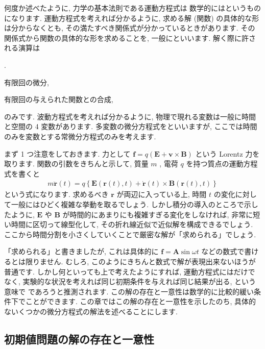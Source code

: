 \documentclass[openany, a4paper, oneside]{book}
\newcounter{enum2}
\renewenvironment{enumerate}{%
\begin{list}%
{%
\arabic{enum2}.\ \,%
}%
{%
\usecounter{enum2}
\setlength{\itemindent}{0pt}%
\setlength{\leftmargin}{6pt}%
\setlength{\rightmargin}{0pt}%
\setlength{\labelsep}{0pt}%
\setlength{\labelwidth}{6pt}%
\setlength{\itemsep}{0pt}%
\setlength{\parsep}{0pt}%
\setlength{\listparindent}{0pt}%
}
}{%
\end{list}%
}
\theoremstyle{break}
\theoremstyle{breakdefn}
\begin{document}
何度か述べたように, 力学の基本法則である運動方程式は
数学的にはというものになります.
運動方程式を考えれば分かるように,
求める解 (関数) の具体的な形は分からなくとも, その満たすべき関係式が分かっているときがあります.
その関係式から関数の具体的な形を求めることを,
一般にといいます.
解く際に許される演算は
\begin{enumerate}
\item[1)] 有限回の微分,
\item[2)] 有限回の与えられた関数との合成,
\end{enumerate}
のみです.
波動方程式を考えれば分かるように, 物理で現れる変数は一般に時間と空間の 4 変数があります.
多変数の微分方程式をといいますが,
ここでは時間のみを変数とする常微分方程式のみを考えます.

まず 1 つ注意をしておきます.
力として $\bm{f} = q ( \bm{E} + \bm{v} \times \bm{B} )$ という Lorentz 力を取ります.
関数の引数をきちんと示して, 質量 $m$ , 電荷 $q$ を持つ質点の運動方程式を書くと
\begin{gather}
m \ddot{ \bm{r} } (t)
=
q \left \{ \bm{E} ( \bm{r} (t) , t ) + \dot{ \bm{r} } (t) \times \bm{B} ( \bm{r} (t) , t )  \right \}
\end{gather}
という式になります.
求めるべき $\bm{r}$ が両辺に入っている上, 時間 $t$ の変化に対して一般にはひどく複雑な挙動を取るでしょう.
しかし積分の導入のところで示したように,  $\bm{E}$ や $\bm{B}$ が時間的にあまりにも複雑すぎる変化をしなければ,
非常に短い時間に区切って線型化して, その折れ線近似で近似解を構成できるでしょう.
ここから時間分割を小さくしていくことで厳密な解が「求められる」でしょう.

「求められる」と書きましたが, これは具体的に $\bm{f} = \bm{A} \sin \omega t$ などの数式で書けるとは限りません.
むしろ, このようにきちんと数式で解が表現出来ないほうが普通です.
しかし何といっても上で考えたようにすれば, 運動方程式にはだけでなく,
実験的な状況を考えれば同じ初期条件を与えれば同じ結果が出る, という意味で
であろうと推測されます.
この解の存在と一意性は数学的に比較的緩い条件下でことができます.
この章ではこの解の存在と一意性を示したのち, 具体的ないくつかの微分方程式の解法を述べることにします.
\subsection{初期値問題の解の存在と一意性}
\label{sec-5-2-12-2}
\end{document}
